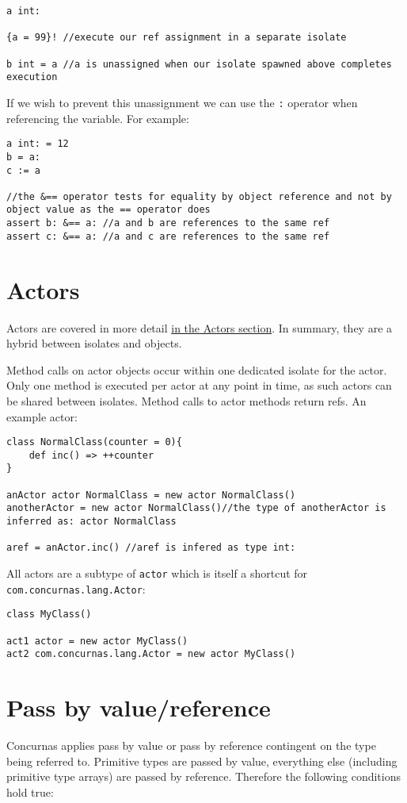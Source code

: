\documentclass[conc-doc]{subfiles}
\begin{document}
\begin{lstlisting}
a int:

{a = 99}! //execute our ref assignment in a separate isolate

b int = a //a is unassigned when our isolate spawned above completes execution
\end{lstlisting}

If we wish to prevent this unassignment we can use the \lstinline{:} operator when referencing the variable. For example:

\begin{lstlisting}
a int: = 12
b = a:
c := a

//the &== operator tests for equality by object reference and not by object value as the == operator does
assert b: &== a: //a and b are references to the same ref
assert c: &== a: //a and c are references to the same ref
\end{lstlisting}


\section{Actors}
Actors are covered in more detail \hyperref[sec:actors]{in the Actors section}. In summary, they are a hybrid between isolates and objects.

Method calls on actor objects occur within one dedicated isolate for the actor. Only one method is executed per actor at any point in time, as such actors can be shared between isolates. Method calls to actor methods return refs. An example actor:

\begin{lstlisting}
class NormalClass(counter = 0){
	def inc() => ++counter
}

anActor actor NormalClass = new actor NormalClass()
anotherActor = new actor NormalClass()//the type of anotherActor is inferred as: actor NormalClass

aref = anActor.inc() //aref is infered as type int:
\end{lstlisting}

All actors are a subtype of \lstinline{actor} which is itself a shortcut for \lstinline{com.concurnas.lang.Actor}:

\begin{lstlisting}
class MyClass()

act1 actor = new actor MyClass()
act2 com.concurnas.lang.Actor = new actor MyClass()	
\end{lstlisting}

\section{Pass by value/reference}
Concurnas applies pass by value or pass by reference contingent on the type being referred to. Primitive types are passed by value, everything else (including primitive type arrays) are passed by reference. Therefore the following conditions hold true:
\end{document}

